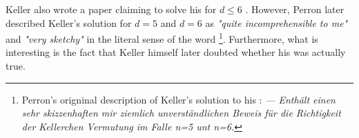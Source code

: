 \documentclass[../thesis.tex]{subfiles}
\begin{document}
\begin{remark}
    Keller also wrote a paper claiming to solve his  for $d\leq 6$ \cite{Keller1937}. However, Perron later described Keller's solution for $d=5$ and $d=6$ as \emph{"quite incomprehensible to me"} and \emph{"very sketchy"} in the literal sense of the word \cite{perronUeberLueckenloseAusfuellung1940} \footnote[1]{Perron's origninal description of Keller's solution to his : \emph{— Enthält einen sehr skizzenhaften mir ziemlich unverständlichen Beweis für die Richtigkeit der Kellerchen Vermutung im Falle n=5 unt n=6.}}. Furthermore, what is interesting is the fact that Keller himself later doubted whether his  was actually true.
\end{remark}
\end{document}
